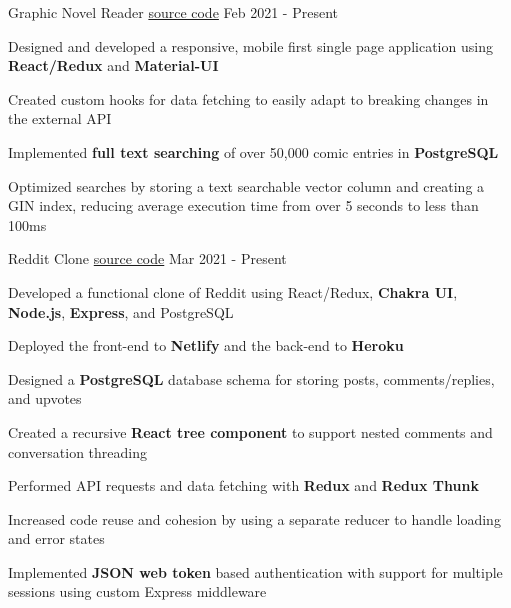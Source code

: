 
\begin{cventries}
  \cventry
    {\fontsize{10pt}{1em}\bodyfont\upshape\color{text}{Front-end comic reading client for the MangaDex API}} %
    {Graphic Novel Reader} %
    {\href{https://github.com/tacticaltofu/mangastack}{source code}} %
    {Feb 2021 - Present} %
    {
      \begin{cvitems} %
        \item {Designed and developed a responsive, mobile first single page application using \textbf{React/Redux} and \textbf{Material-UI}}
        \item {Created custom hooks for data fetching to easily adapt to breaking changes in the external API}
        \item {Implemented \textbf{full text searching} of over 50,000 comic entries in \textbf{PostgreSQL}}
        \item {Optimized searches by storing a text searchable vector column and creating a GIN index, reducing average execution time from over 5 seconds to less than 100ms}
      \end{cvitems}
    }
    
  \cventry
    {\fontsize{10pt}{1em}\bodyfont\upshape\color{text}{Social news and discussion website very similar to Reddit}} %
    {Reddit Clone} %
    {\href{https://github.com/tacticaltofu/reddit-clone}{source code}} %
    {Mar 2021 - Present} %
    {
      \begin{cvitems} %
        \item {Developed a functional clone of Reddit using React/Redux, \textbf{Chakra UI}, \textbf{Node.js}, \textbf{Express}, and PostgreSQL}
        \item {Deployed the front-end to \textbf{Netlify} and the back-end to \textbf{Heroku} }
        \item {Designed a \textbf{PostgreSQL} database schema for storing posts, comments/replies, and upvotes}
        \item {Created a recursive \textbf{React tree component} to support nested comments and conversation threading}
        \item {Performed API requests and data fetching with \textbf{Redux} and \textbf{Redux Thunk}}
        \item {Increased code reuse and cohesion by using a separate reducer to handle loading and error states}
        \item {Implemented \textbf{JSON web token} based authentication with support for multiple sessions using custom Express middleware}
      \end{cvitems}
    }
\end{cventries}